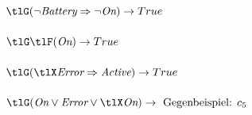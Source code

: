 \documentclass[12pt,a4paper]{../krautsourcing/homework}
\newcommand{\eBattery}{\textit{Battery}}
\newcommand{\eOn}{\textit{On}}
\newcommand{\eActive}{\textit{Active}}
\newcommand{\eError}{\textit{Error}}
\begin{document}
\subsubsection{}

\(\tlG (\lnot \eBattery \Rightarrow \lnot \eOn) \rightarrow True\)

\subsubsection{}

\(\tlG \tlF (\eOn) \rightarrow True \)

\subsubsection{}


\(\tlG (\tlX \eError \Rightarrow \eActive) \rightarrow True\)

\subsubsection{}

\(\tlG (\eOn \lor \eError \lor \tlX \eOn) \rightarrow \text{ Gegenbeispiel: } c_5\)
\end{document}
